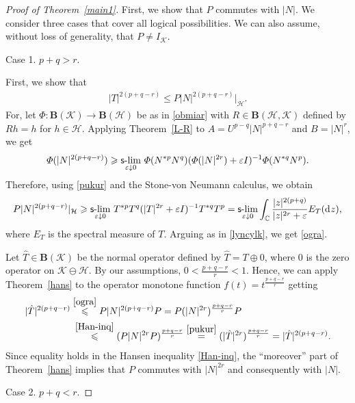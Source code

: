 \documentclass[reqno]{amsproc}
\numberwithin{equation}{section}
\theoremstyle{remark}
\newcommand*{\hh}{\mathcal{H}}
\newcommand*{\kk}{\mathcal{K}}
\newcommand*{\comp}{\mathbb{C}}
\newcommand*{\D}{\mathrm{d\hspace{.1ex}}}
\theoremstyle{definition}
\newcommand*{\Le}{\leqslant}
\newcommand*{\Ge}{\geqslant}
\newcommand*{\ogr}{\boldsymbol{B}}
\def\sslim{\qopname\relax m{{\sf{s}\textrm-}lim}}
\begin{document}
   \begin{proof}[Proof of Theorem~\ref{main1}]
First, we show that $P$ commutes with $|N|$.
We consider three cases that cover all
logical possibilities. We can also assume,
without loss of generality, that $P \neq
I_{\kk}$.

{\sc Case 1.} $p+q>r$.

First, we show that
   \begin{align} \label{ogra}
|T|^{2(p+q-r)} \Le P |N|^{2(p+q-r)}|_\hh.
   \end{align}
For, let $\varPhi\colon \ogr(\kk)\to
\ogr(\hh)$ be as in \eqref{obmiar} with
$R\in \ogr(\hh,\kk)$ defined by $Rh=h$ for
$h\in \hh$. Applying Theorem~\ref{L-R} to
$A=U^{p- q}|N|^{p+q-r}$ and $B=|N|^r$, we
get
   \begin{align*}
\varPhi(|N|^{2(p+q-r)})\Ge
\sslim_{\varepsilon\downarrow 0}\,
\varPhi(N^{*p}N^q)(\varPhi(|N|^{2r})+\varepsilon
I)^{-1}\varPhi(N^{*q}N^p).
   \end{align*}
Therefore, using \eqref{pukur} and the
Stone-von Neumann calculus, we obtain
   \begin{align*}
P |N|^{2(p+q-r)}|_\hh \Ge
\sslim_{\varepsilon\downarrow 0}\,
T^{*p}T^q(|T|^{2r}+\varepsilon I)^{-1}T^{*q}T^p =
\sslim_{\varepsilon \downarrow 0} \int_\comp
\frac{|z|^{2(p+q)}} {|z|^{2r}+\varepsilon} E_{T}(\D
z),
   \end{align*}
where $E_{T}$ is the spectral measure of $T$. Arguing
as in \eqref{lyncylk}, we get \eqref{ogra}.

Let $\hat T\in \ogr(\kk)$ be the normal operator
defined by $\hat T = T \oplus 0$, where $0$ is the
zero operator on $\kk\ominus \hh$. By our assumptions,
$0 < \frac{p+q-r}{r}<1$. Hence, we can apply
Theorem~\ref{hans} to the operator monotone function
$f(t)=t^{\frac{p+q-r}{r}}$ getting
   \allowdisplaybreaks
   \begin{align*}
|\hat{T}|^{2(p+q-r)} & \overset{\eqref{ogra}}{\Le} P
|N|^{2(p+q-r)}P =P (|N|^{2r})^\frac{p+q-r}{r}P
   \\
& \hspace{.5ex} \overset{\eqref{Han-inq}}{\Le} (P
|N|^{2r}P)^\frac{p+q-r}{r} \overset{\eqref{pukur}} =
(|\hat{T}|^{2r})^\frac{p+q-r}{r} =
|\hat{T}|^{2(p+q-r)}.
   \end{align*}
Since equality holds in the Hansen
inequality \eqref{Han-inq}, the ``moreover''
part of Theorem~\ref{hans} implies that $P$
commutes with $|N|^{2r}$ and consequently
with $|N|$.

 {\sc Case 2.} $p+q < r$.


\end{proof}
\end{document}

